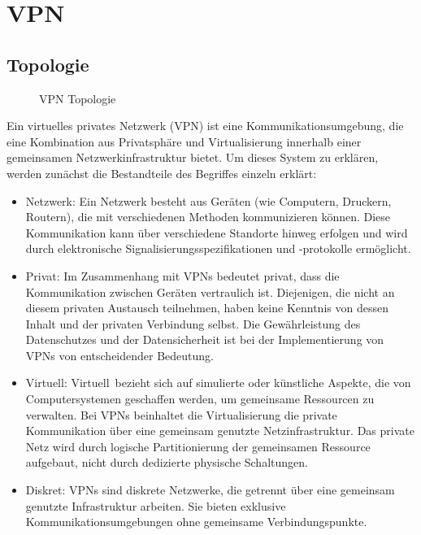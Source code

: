 \section{VPN}

\subsection{Topologie}

\begin{figure}[h!]
    \centering
    
    \caption{VPN Topologie}
    \label{imgs:vpn}
\end{figure}

Ein virtuelles privates Netzwerk (VPN) ist eine Kommunikationsumgebung, die eine Kombination aus Privatsphäre und Virtualisierung innerhalb einer gemeinsamen Netzwerkinfrastruktur bietet. Um dieses System zu erklären, werden zunächst die Bestandteile des Begriffes einzeln erklärt:

\begin{itemize}

\item Netzwerk: Ein Netzwerk besteht aus Geräten (wie Computern, Druckern, Routern), die mit verschiedenen Methoden kommunizieren können. Diese Kommunikation kann über verschiedene Standorte hinweg erfolgen und wird durch elektronische Signalisierungsspezifikationen und -protokolle ermöglicht.

\item Privat: Im Zusammenhang mit VPNs bedeutet \glqq privat\grqq, dass die Kommunikation zwischen Geräten vertraulich ist. Diejenigen, die nicht an diesem privaten Austausch teilnehmen, haben keine Kenntnis von dessen Inhalt und der privaten Verbindung selbst. Die Gewährleistung des Datenschutzes und der Datensicherheit ist bei der Implementierung von VPNs von entscheidender Bedeutung.

\item Virtuell: \glqq Virtuell\grqq\ bezieht sich auf simulierte oder künstliche Aspekte, die von Computersystemen geschaffen werden, um gemeinsame Ressourcen zu verwalten. Bei VPNs beinhaltet die Virtualisierung die private Kommunikation über eine gemeinsam genutzte Netzinfrastruktur. Das private Netz wird durch logische Partitionierung der gemeinsamen Ressource aufgebaut, nicht durch dedizierte physische Schaltungen.

\item Diskret: VPNs sind diskrete Netzwerke, die getrennt über eine gemeinsam genutzte Infrastruktur arbeiten. Sie bieten exklusive Kommunikationsumgebungen ohne gemeinsame Verbindungspunkte.

\end{itemize}

